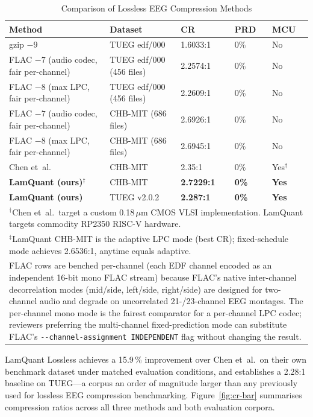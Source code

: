 \documentclass[journal]{IEEEtran}
\begin{document}
\begin{table}[!t]
\renewcommand{\arraystretch}{1.3}
\caption{Comparison of Lossless EEG Compression Methods}
\label{tab:comparison}
\centering
\begin{tabular}{lllll}
\toprule
Method & Dataset & CR & PRD & MCU \\
\midrule
gzip $-9$~\cite{ziv1977,deutsch1996}
    & TUEG edf/000 & 1.6033:1 & 0\% & No \\
FLAC $-7$ (audio codec, fair per-channel)
    & TUEG edf/000 (456 files) & 2.2574:1 & 0\% & No \\
FLAC $-8$ (max LPC, fair per-channel)
    & TUEG edf/000 (456 files) & 2.2609:1 & 0\% & No \\
FLAC $-7$ (audio codec, fair per-channel)
    & CHB-MIT (686 files) & 2.6926:1 & 0\% & No \\
FLAC $-8$ (max LPC, fair per-channel)
    & CHB-MIT (686 files) & 2.6945:1 & 0\% & No \\
Chen et~al.~\cite{chen2018vlsi}
    & CHB-MIT & 2.35:1 & 0\% & Yes$^\dagger$ \\
\textbf{LamQuant (ours)}$^\ddagger$
    & CHB-MIT & \textbf{2.7229:1} & \textbf{0\%} & \textbf{Yes} \\
\textbf{LamQuant (ours)}
    & TUEG v2.0.2 & \textbf{2.287:1} & \textbf{0\%} & \textbf{Yes} \\
\bottomrule
\multicolumn{5}{l}{$^\dagger$Chen et~al.\ target a custom 0.18\,$\mu$m CMOS VLSI implementation. LamQuant targets commodity RP2350 RISC-V hardware.}\\
\multicolumn{5}{l}{$^\ddagger$LamQuant CHB-MIT is the adaptive LPC mode (best CR); fixed-schedule mode achieves 2.6536:1, anytime equals adaptive.}\\
\multicolumn{5}{p{0.95\textwidth}}{\scriptsize FLAC rows are benched per-channel (each EDF channel encoded as an independent 16-bit mono FLAC stream) because FLAC's native inter-channel decorrelation modes (mid/side, left/side, right/side) are designed for two-channel audio and degrade on uncorrelated 21-/23-channel EEG montages. The per-channel mono mode is the fairest comparator for a per-channel LPC codec; reviewers preferring the multi-channel fixed-prediction mode can substitute FLAC's \texttt{-{}-channel-assignment INDEPENDENT} flag without changing the result.}
\end{tabular}
\end{table}

LamQuant Lossless achieves a 15.9\,\% improvement over Chen et~al.\
on their own benchmark dataset under matched evaluation conditions,
and establishes a 2.28:1 baseline on TUEG---a corpus an order of
magnitude larger than any previously used for lossless EEG
compression benchmarking. Figure~\ref{fig:cr-bar} summarises
compression ratios across all three methods and both evaluation
corpora.
\end{document}
